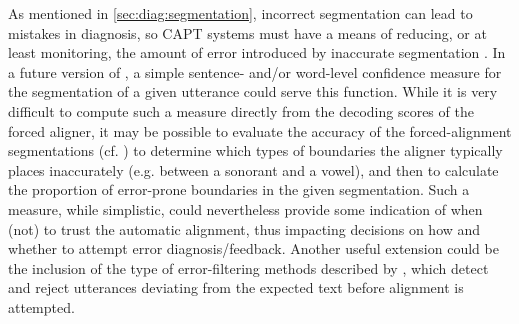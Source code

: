 	
	
	As mentioned in \cref{sec:diag:segmentation}, 
	incorrect segmentation can lead to mistakes in diagnosis, so CAPT systems must have a means of reducing, or at least monitoring, the amount of error introduced by inaccurate segmentation \citep{Eskenazi2009}. 
	In a future version of , a simple sentence- and/or word-level confidence measure for the segmentation of a given utterance could serve this function. 
	While it is very difficult to compute such a measure directly from the decoding scores of the forced aligner, it may be possible to evaluate the accuracy of the forced-alignment segmentations (cf. \cite{Mesbahi2011}) to determine 
	which types of boundaries the aligner typically places inaccurately (e.g. between a sonorant and a vowel), and then to calculate the proportion of error-prone boundaries in the given segmentation. Such a measure, while simplistic, could nevertheless provide some indication of when (not) to trust the automatic alignment, thus impacting decisions on how and whether to attempt error diagnosis/feedback.
	Another useful extension could be the inclusion of the type of error-filtering methods described by \textcite{Bonneau2012,Orosanu2012}, which detect and reject utterances deviating from the expected text before alignment is attempted.
	
	
	
	
	
	
	
	
	

	
	
	
